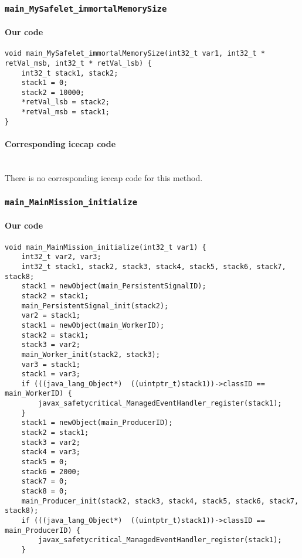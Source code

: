 \begin{landscape}
\begin{multicols}{2}
\subsubsection{\texttt{main\_MySafelet\_immortalMemorySize}}

\paragraph{Our code}\hfill
\begin{lstlisting}[firstnumber=2301]
void main_MySafelet_immortalMemorySize(int32_t var1, int32_t * retVal_msb, int32_t * retVal_lsb) {
	int32_t stack1, stack2;
	stack1 = 0;
	stack2 = 10000;
	*retVal_lsb = stack2;
	*retVal_msb = stack1;
}
\end{lstlisting}

\paragraph{Corresponding icecap code}\hfill\\
There is no corresponding icecap code for this method.

\subsubsection{\texttt{main\_MainMission\_initialize}}

\paragraph{Our code}\hfill
\begin{lstlisting}[firstnumber=2329]
void main_MainMission_initialize(int32_t var1) {
	int32_t var2, var3;
	int32_t stack1, stack2, stack3, stack4, stack5, stack6, stack7, stack8;
	stack1 = newObject(main_PersistentSignalID);
	stack2 = stack1;
	main_PersistentSignal_init(stack2);
	var2 = stack1;
	stack1 = newObject(main_WorkerID);
	stack2 = stack1;
	stack3 = var2;
	main_Worker_init(stack2, stack3);
	var3 = stack1;
	stack1 = var3;
	if (((java_lang_Object*)  ((uintptr_t)stack1))->classID == main_WorkerID) {
		javax_safetycritical_ManagedEventHandler_register(stack1);
	}
	stack1 = newObject(main_ProducerID);
	stack2 = stack1;
	stack3 = var2;
	stack4 = var3;
	stack5 = 0;
	stack6 = 2000;
	stack7 = 0;
	stack8 = 0;
	main_Producer_init(stack2, stack3, stack4, stack5, stack6, stack7, stack8);
	if (((java_lang_Object*)  ((uintptr_t)stack1))->classID == main_ProducerID) {
		javax_safetycritical_ManagedEventHandler_register(stack1);
	}


\end{lstlisting}
\end{multicols}
\end{landscape}
